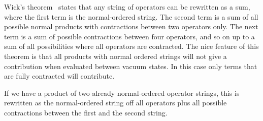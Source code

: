 Wick's theorem~\cite{PhysRev.80.268} states that any string of operators can be rewritten as a sum,
where the first term is the normal-ordered string.
The second term is a sum of all possible normal products with contractions between two operators only.
The next term is a sum of possible contractions between four operators, and so
on up to a sum of all possibilities where all operators are contracted.
The nice feature of this theorem is that all products with normal ordered
strings will not give a contribution when evaluated between vacuum states.
In this case only terms that are fully contracted will contribute.

If we have a product of two already normal-ordered operator strings, this is rewritten as the normal-ordered string off all operators plus all possible contractions between the first and the second string.

